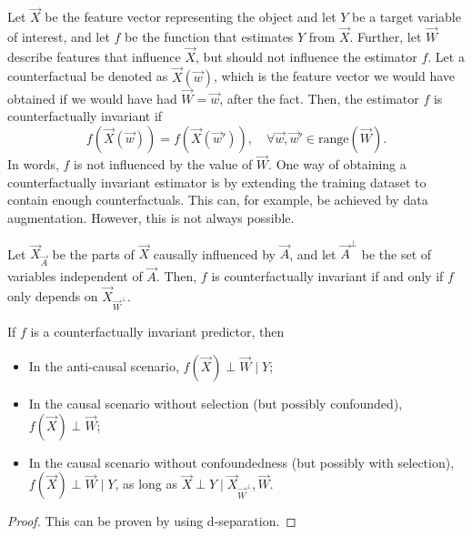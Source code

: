 Let $\vec{X}$ be the feature vector representing the object and let $Y$ be a target variable of
interest, and let $f$ be the function that estimates $Y$ from $\vec{X}$. Further, let $\vec{W}$
describe features that influence $\vec{X}$, but should not influence the estimator $f$. Let a
counterfactual be denoted as $\vec{X}(\vec{w})$, which is the feature vector we would have obtained
if we would have had $\vec{W} = \vec{w}$, after the fact. Then, the estimator $f$ is
counterfactually invariant if \[
    f(\vec{X}(\vec{w})) = f(\vec{X}(\vec{w}')), \quad \forall \vec{w}, \vec{w}' \in \mathrm{range}(\vec{W}).
\]
In words, $f$ is not influenced by the value of $\vec{W}$. One way of obtaining a counterfactually
invariant estimator is by extending the training dataset to contain enough counterfactuals. This
can, for example, be achieved by data augmentation. However, this is not always possible.

Let $\vec{X}_{\vec{A}}$ be the parts of $\vec{X}$ causally influenced by $\vec{A}$, and let
$\vec{A}^\perp$ be the set of variables independent of $\vec{A}$. Then, $f$ is counterfactually
invariant if and only if $f$ only depends on $\vec{X}_{\vec{W}^\perp}$.

\begin{theorem}
    If $f$ is a counterfactually invariant predictor, then
    \begin{itemize}
        \item In the anti-causal scenario, $f(\vec{X}) \perp \vec{W} \mid Y$;
        \item In the causal scenario without selection (but possibly confounded), $f(\vec{X}) \perp \vec{W}$;
        \item In the causal scenario without confoundedness (but possibly with selection), $f(\vec{X}) \perp
                  \vec{W} \mid Y$, as long as $\vec{X} \perp Y \mid \vec{X}_{\vec{W}^\perp}, \vec{W}$.
    \end{itemize}
\end{theorem}

\begin{proof}
    This can be proven by using d-separation.
\end{proof}
